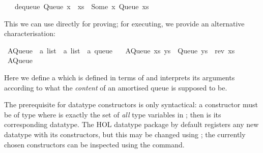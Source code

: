 \begin{isabellebody}
\ \ {\isacharbar}\ {\isachardoublequoteopen}dequeue\ {\isacharparenleft}Queue\ {\isacharparenleft}x\ {\isacharhash}\ xs{\isacharparenright}{\isacharparenright}\ {\isacharequal}\ {\isacharparenleft}Some\ x{\isacharcomma}\ Queue\ xs{\isacharparenright}{\isachardoublequoteclose}%
\endisatagquote
{\isafoldquote}%
%
\isadelimquote
%
\endisadelimquote
%
\begin{isamarkuptext}%
\noindent This we can use directly for proving;  for executing,
  we provide an alternative characterisation:%
\end{isamarkuptext}%
\isamarkuptrue%
%
\isadelimquote
%
\endisadelimquote
%
\isatagquote
{}\isamarkupfalse%
\ AQueue\ {\isacharcolon}{\isacharcolon}\ {\isachardoublequoteopen}{\isacharprime}a\ list\ {\isasymRightarrow}\ {\isacharprime}a\ list\ {\isasymRightarrow}\ {\isacharprime}a\ queue{\isachardoublequoteclose}\ \isanewline
\ \ {\isachardoublequoteopen}AQueue\ xs\ ys\ {\isacharequal}\ Queue\ {\isacharparenleft}ys\ {\isacharat}\ rev\ xs{\isacharparenright}{\isachardoublequoteclose}\isanewline
\isanewline
{}\isamarkupfalse%
\ AQueue%
\endisatagquote
{\isafoldquote}%
%
\isadelimquote
%
\endisadelimquote
%
\begin{isamarkuptext}%
\noindent Here we define a   which
  is defined in terms of  and interprets its arguments
  according to what the \emph{content} of an amortised queue is supposed
  to be.

  The prerequisite for datatype constructors is only syntactical: a
  constructor must be of type  where  is exactly the set of \emph{all} type variables in
  \isa{{\isasymtau}}; then \isa{{\isasymkappa}} is its corresponding datatype.  The
  HOL datatype package by default registers any new datatype with its
  constructors, but this may be changed using \hypertarget{command.code-datatype}{\hyperlink{command.code-datatype}{\mbox{}}}; the currently chosen constructors can be inspected
  using the \hyperlink{command.print-codesetup}{\mbox{}} command.


\end{isamarkuptext}
\end{isabellebody}
